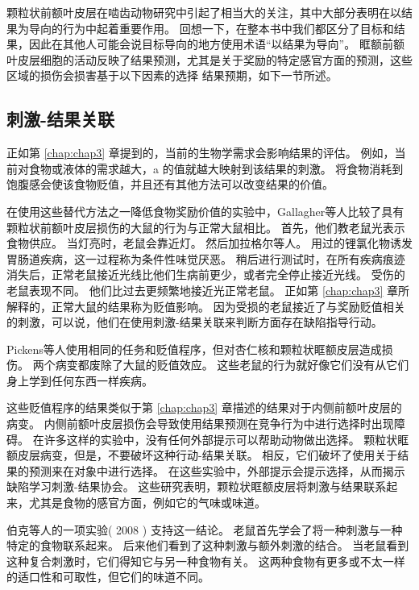 颗粒状前额叶皮层在啮齿动物研究中引起了相当大的关注，其中大部分表明在以结果为导向的行为中起着重要作用。
回想一下，在整本书中我们都区分了目标和结果，因此在其他人可能会说目标导向的地方使用术语“以结果为导向”。
眶额前额叶皮层细胞的活动反映了结果预测，尤其是关于奖励的特定感官方面的预测\cite{schoenbaum1998orbitofrontal}，这些区域的损伤会损害基于以下因素的选择
结果预期，如下一节所述。



\subsection{刺激-结果关联}

正如第 \ref{chap:chap3} 章提到的，当前的生物学需求会影响结果的评估。
例如，当前对食物或液体的需求越大，a 的值就越大映射到该结果的刺激。
将食物消耗到饱腹感会使该食物贬值，并且还有其他方法可以改变结果的价值。\par


在使用这些替代方法之一降低食物奖励价值的实验中，Gallagher等人\cite{gallagher1999orbitofrontal}比较了具有颗粒状前额叶皮层损伤的大鼠的行为与正常大鼠相比。
首先，他们教老鼠光表示食物供应。
当灯亮时，老鼠会靠近灯。
然后加拉格尔等人。
用过的锂氯化物诱发胃肠道疾病，这一过程称为条件性味觉厌恶。
稍后进行测试时，在所有疾病痕迹消失后，正常老鼠接近光线比他们生病前更少，或者完全停止接近光线。
受伤的老鼠表现不同。
他们比过去更频繁地接近光正常老鼠。
正如第 \ref{chap:chap3} 章所解释的，正常大鼠的结果称为贬值影响。
因为受损的老鼠接近了与奖励贬值相关的刺激，可以说，他们在使用刺激-结果关联来判断方面存在缺陷指导行动。\par


Pickens等人\cite{pickens2005orbitofrontal,pickens2003different}使用相同的任务和贬值程序，但对杏仁核和颗粒状眶额皮层造成损伤。
两个病变都废除了大鼠的贬值效应。
这些老鼠的行为就好像它们没有从它们身上学到任何东西一样疾病。\par


这些贬值程序的结果类似于第 \ref{chap:chap3} 章描述的结果对于内侧前额叶皮层的病变。
内侧前额叶皮层损伤会导致使用结果预测在竞争行为中进行选择时出现障碍。
在许多这样的实验中，没有任何外部提示可以帮助动物做出选择。
颗粒状眶额皮层病变，但是，不要破坏这种行动-结果关联\cite{ostlund2007orbitofrontal}。
相反，它们破坏了使用关于结果的预测来在对象中进行选择。
在这些实验中，外部提示会提示选择，从而揭示缺陷学习刺激-结果协会。
这些研究表明，颗粒状眶额皮层将刺激与结果联系起来，尤其是食物的感官方面，例如它的气味或味道。\par


伯克等人的一项实验( 2008 ) 支持这一结论。
老鼠首先学会了将一种刺激与一种特定的食物联系起来。 后来他们看到了这种刺激与额外刺激的结合。
当老鼠看到这种复合刺激时，它们得知它与另一种食物有关。
这两种食物有更多或不太一样的适口性和可取性，但它们的味道不同。\par


